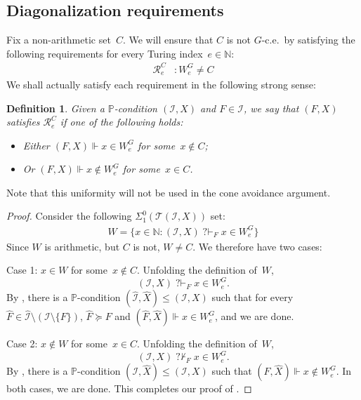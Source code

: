 \documentclass[10pt,a4paper]{article}
\def\PP{\mathbb{P}}
\def\Tc{\mathcal{T}}
\def\I{\mathcal{I}}
\def\Rc{\mathcal{R}}
\newcommand{\qvdash}{\operatorname{{?}{\vdash}}}
\newcommand{\nqvdash}{\operatorname{{?}{\nvdash}}}
\newcommand{\NN}[0]{\mathbb{N}}
\def\h#1{\hat{#1}}
\numberwithin{theorem}{section}
\newtheorem{lemma}[theorem]{Lemma}
\newtheorem{definition}[theorem]{Definition}
\begin{document}
\subsection{Diagonalization requirements}

Fix a non-arithmetic set~$C$. We will ensure that $C$ is not $G$-c.e.\ by satisfying the following requirements for every Turing index~$e \in \NN$:
\begin{align*}
\Rc^C_e & : W^G_e \neq C
\end{align*}
We shall actually satisfy each requirement in the following strong sense:

\begin{definition}
Given a $\PP$-condition $(\I, X)$ and $F \in \I$, we say that \emph{$(F, X)$ satisfies $\Rc^C_e$} if one of the following holds:
\begin{itemize}
    \item[(1)] Either $(F, X) \Vdash x \in W^G_e$ for some~$x \not \in C$;
    \item[(2)] Or $(F, X) \Vdash x \not \in W^G_e$ for some~$x \in C$.
\end{itemize}
\end{definition}

Note that this uniformity will not be used in the cone avoidance argument.

\begin{proof}
Consider the following $\Sigma^0_1(\Tc(\I, X))$ set:
\begin{align*}
W = \{ x \in \NN : (\I, X) \qvdash_F x \in W_e^G \}
\end{align*}
Since $W$ is arithmetic, but $C$ is not, $W \neq C$.
We therefore have two cases:
\smallskip

\noindent
Case 1: $x \in W$ for some~$x \not \in C$. Unfolding the definition of~$W$, 
$$(\I, X) \qvdash_F x \in W_e^G.$$
By , there is a $\PP$-condition $(\h \I, \h X) \leq (\I, X)$ such that for every~$\h F \in \h \I \setminus (\I \setminus \{F\})$, $\h F \succeq F$ and $(\h F, \h X) \Vdash x \in W_e^G$, and we are done.
\smallskip

\noindent
Case 2: $x \not \in W$ for some~$x \in C$. Unfolding the definition of~$W$, 
$$(\I, X) \nqvdash_F x \in W_e^G.$$
By , there is a $\PP$-condition $(\I, \h X) \leq (\I, X)$ such that $(F, \h X) \Vdash x \not \in W^G_e$.
In both cases, we are done. This completes our proof of .
\end{proof}
\end{document}
